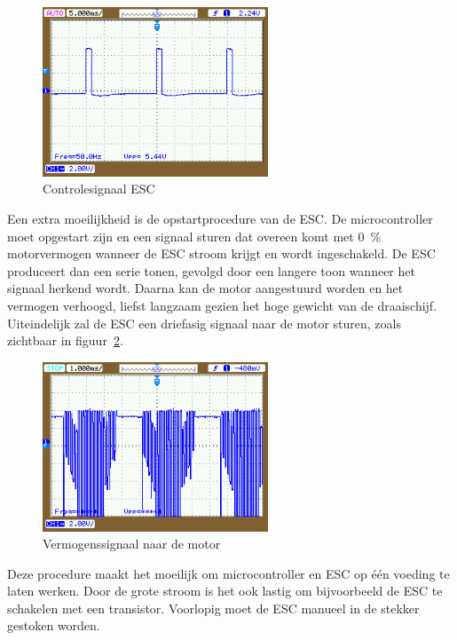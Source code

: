 \documentclass[a4paper, 12pt]{article}
\begin{document}
\begin{figure}
  \centering
  \includegraphics[width=0.6\textwidth]{img/scoopcontrolesc.png}
  \caption{Controlesignaal ESC}
  \label{fig:motorpwm}
\end{figure}


Een extra moeilijkheid is de opstartprocedure van de ESC.
De microcontroller moet opgestart zijn en een signaal sturen dat overeen komt
met \SI{0}{\percent} motorvermogen wanneer de ESC stroom krijgt en wordt
ingeschakeld. De ESC produceert dan een serie tonen, gevolgd door een langere
toon wanneer het signaal herkend wordt. Daarna kan de motor aangestuurd worden
en het vermogen verhoogd, liefst langzaam gezien het hoge gewicht van de draaischijf.
Uiteindelijk zal de ESC een driefasig signaal naar de motor sturen, zoals
zichtbaar in figuur~\ref{fig:motoresc}.

\begin{figure}
  \centering
  \includegraphics[width=0.6\textwidth]{img/scoopesc.png}
  \caption{Vermogenssignaal naar de motor}
  \label{fig:motoresc}
\end{figure}


Deze procedure maakt het moeilijk om microcontroller en ESC op één voeding te
laten werken. Door de grote stroom is het ook lastig om bijvoorbeeld de ESC te
schakelen met een transistor. Voorlopig moet de ESC manueel in de stekker
gestoken worden.
\end{document}
